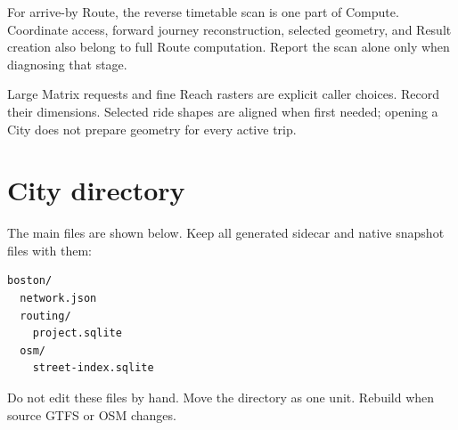 \documentclass[10pt,letterpaper]{article}
\begin{document}
For arrive-by Route, the reverse timetable scan is one part of Compute. Coordinate access, forward journey reconstruction, selected geometry, and Result creation also belong to full Route computation. Report the scan alone only when diagnosing that stage.

Large Matrix requests and fine Reach rasters are explicit caller choices. Record their dimensions. Selected ride shapes are aligned when first needed; opening a City does not prepare geometry for every active trip.

\section{City directory}

The main files are shown below. Keep all generated sidecar and native snapshot files with them:

\begin{lstlisting}
boston/
  network.json
  routing/
    project.sqlite
  osm/
    street-index.sqlite
\end{lstlisting}

Do not edit these files by hand. Move the directory as one unit. Rebuild when source GTFS or OSM changes.
\end{document}
